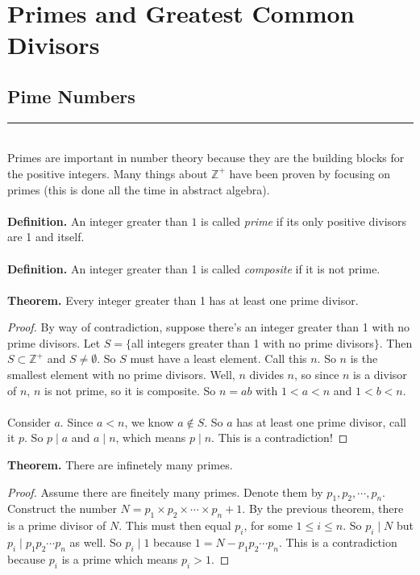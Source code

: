 \documentclass[class=article, crop=false]{standalone}
\def\integers{{\mathbb Z}}
\begin{document}
\setcounter{section}{2}
\section{Primes and Greatest Common Divisors}

\subsection{Pime Numbers}
\rule{\textwidth}{1pt}\\
Primes are important in number theory because they are the building blocks for the positive integers.
Many things about $\integers^+$ have been proven by focusing on primes (this is done all the time in abstract algebra).\\\\
\textbf{Definition.} An integer greater than $1$ is called \emph{prime} if its only positive divisors are 
1 and itself.\\\\
\textbf{Definition.} An integer greater than 1 is called \emph{composite} if it is not prime.\\\\
\textbf{Theorem.} Every integer greater than 1 has at least one prime divisor.
\begin{proof}
	By way of contradiction, suppose there's an integer greater than 1 with no prime divisors.
	Let $S=\{$all integers greater than 1 with no prime divisors$\}$.
	Then $S\subset\integers^+$ and $S\neq\emptyset$. So $S$ must have a least element. Call this $n$.
	So $n$ is the smallest element with no prime divisors. Well, $n$ divides $n$, so since $n$ is a divisor
	of $n$, $n$ is not prime, so it is composite. So $n=ab$ with $1<a<n$ and $1<b<n$.\\\\
	Consider $a$. Since $a<n$, we know $a\notin S$. So $a$ has at least one prime divisor, call it $p$.
	So $p\mid a$ and $a\mid n$, which means $p\mid n$. This is a contradiction!
\end{proof}
\noindent\textbf{Theorem.} There are infinetely many primes.
\begin{proof}
	Assume there are fineitely many primes. Denote them by $p_1, p_2, \cdots, p_n$. Construct the number
	$N=p_1\times p_2\times \cdots \times p_n + 1$. By the previous theorem, there is a prime divisor of $N$.
	This must then equal $p_i$, for some $1\leq i\leq n$. So $p_i \mid N$ but $p_i\mid p_1 p_2\cdots p_n$ as well.
	So $p_i\mid 1$ because $1=N-p_1p_2\cdots p_n$. This is a contradiction because $p_i$ is a prime which means $p_i >1$.
\end{proof}
\end{document}

